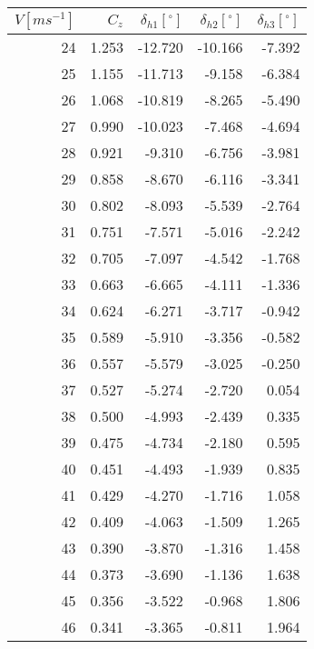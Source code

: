 \documentclass{sprawozdanie}
\begin{document}
\begin{table}[h!]
    \centering
    \begin{tabular}{rrrrr}
        \toprule
        $V [ms^{-1}]$ &   $C_z$ &  $\delta_{h1}[^{\circ}]$ &  $\delta_{h2}[^{\circ}]$ &  $\delta_{h3}[^{\circ}]$ \\
        \midrule
        24  &  1.253 &   -12.720 &   -10.166 &    -7.392 \\
        25  &  1.155 &   -11.713 &    -9.158 &    -6.384 \\
        26  &  1.068 &   -10.819 &    -8.265 &    -5.490 \\
        27  &  0.990 &   -10.023 &    -7.468 &    -4.694 \\
        28  &  0.921 &    -9.310 &    -6.756 &    -3.981 \\
        29  &  0.858 &    -8.670 &    -6.116 &    -3.341 \\
        30  &  0.802 &    -8.093 &    -5.539 &    -2.764 \\
        31  &  0.751 &    -7.571 &    -5.016 &    -2.242 \\
        32  &  0.705 &    -7.097 &    -4.542 &    -1.768 \\
        33  &  0.663 &    -6.665 &    -4.111 &    -1.336 \\
        34  &  0.624 &    -6.271 &    -3.717 &    -0.942 \\
        35  &  0.589 &    -5.910 &    -3.356 &    -0.582 \\
        36  &  0.557 &    -5.579 &    -3.025 &    -0.250 \\
        37  &  0.527 &    -5.274 &    -2.720 &     0.054 \\
        38  &  0.500 &    -4.993 &    -2.439 &     0.335 \\
        39  &  0.475 &    -4.734 &    -2.180 &     0.595 \\
        40  &  0.451 &    -4.493 &    -1.939 &     0.835 \\
        41  &  0.429 &    -4.270 &    -1.716 &     1.058 \\
        42  &  0.409 &    -4.063 &    -1.509 &     1.265 \\
        43  &  0.390 &    -3.870 &    -1.316 &     1.458 \\
        44  &  0.373 &    -3.690 &    -1.136 &     1.638 \\
        45  &  0.356 &    -3.522 &    -0.968 &     1.806 \\
        46  &  0.341 &    -3.365 &    -0.811 &     1.964 \\

\end{tabular}
\end{table}
\end{document}
